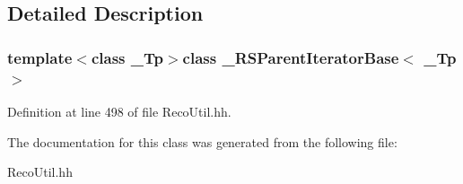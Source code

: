 \subsection{Detailed Description}
\subsubsection*{template$<$class \-\_\-\-Tp$>$class \-\_\-\-R\-S\-Parent\-Iterator\-Base$<$ \-\_\-\-Tp $>$}



Definition at line 498 of file Reco\-Util.\-hh.



The documentation for this class was generated from the following file\-:\begin{DoxyCompactItemize}
\item 
Reco\-Util.\-hh\end{DoxyCompactItemize}
